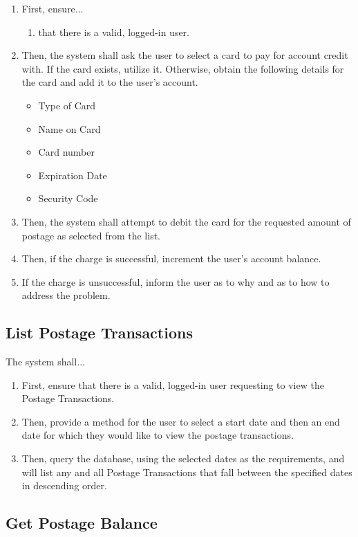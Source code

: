 \documentclass{scrreprt}
\begin{document}
\begin{enumerate}
\item First, ensure...
\begin{enumerate}
\item that there is a valid, logged-in user.
\end{enumerate}
\item Then, the system shall ask the user to select a card to pay for 
account credit with. If the card exists, utilize it. Otherwise, obtain the 
following details for the card and add it to the user's account.
\begin{itemize}
\item Type of Card
\item Name on Card
\item Card number
\item Expiration Date
\item Security Code
\end{itemize}
\item Then, the system shall attempt to debit the card for the requested amount
of postage as selected from the list.
\item Then, if the charge is successful, increment the user's account balance.
\item If the charge is unsuccessful, inform the user as to why and 
as to how to address the problem.
\end{enumerate}

\subsection{List Postage Transactions}

The system shall...

\begin{enumerate}
\item First, ensure that there is a valid, logged-in user requesting to view
the Postage Transactions.
\item Then, provide a method for the user to select a start
date and then an end date for which they would like to view the postage
transactions.
\item Then, query the database, using the selected dates as
the requirements, and will list any and all Postage Transactions that fall
between the specified dates in descending order.
\end{enumerate}

\subsection{Get Postage Balance}
\end{document}
